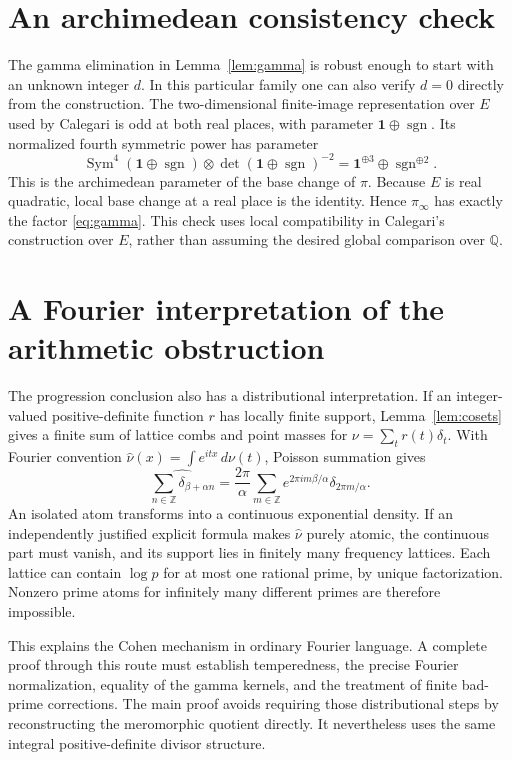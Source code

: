\documentclass[11pt]{article}
\theoremstyle{definition}
\theoremstyle{remark}
\newcommand{\Q}{\mathbb Q}
\newcommand{\Z}{\mathbb Z}
\newcommand{\one}{\mathbf 1}
\newcommand{\dd}{\,d}
\numberwithin{equation}{section}
\begin{document}
\appendix
\section{An archimedean consistency check}

The gamma elimination in Lemma~\ref{lem:gamma} is robust enough to start with an unknown integer $d$. In this particular family one can also verify $d=0$ directly from the construction. The two-dimensional finite-image representation over $E$ used by Calegari is odd at both real places, with parameter $\one\oplus\operatorname{sgn}$. Its normalized fourth symmetric power has parameter
\[
\operatorname{Sym}^4(\one\oplus\operatorname{sgn})
\otimes\det(\one\oplus\operatorname{sgn})^{-2}
=\one^{\oplus3}\oplus\operatorname{sgn}^{\oplus2}.
\]
This is the archimedean parameter of the base change of $\pi$. Because $E$ is real quadratic, local base change at a real place is the identity. Hence $\pi_\infty$ has exactly the factor \eqref{eq:gamma}. This check uses local compatibility in Calegari's construction over $E$, rather than assuming the desired global comparison over $\Q$.

\section{A Fourier interpretation of the arithmetic obstruction}

The progression conclusion also has a distributional interpretation. If an integer-valued positive-definite function $r$ has locally finite support, Lemma~\ref{lem:cosets} gives a finite sum of lattice combs and point masses for
$\nu=\sum_t r(t)\delta_t$. With Fourier convention
$\widehat\nu(x)=\int e^{itx}\dd\nu(t)$, Poisson summation gives
\[
\widehat{\sum_{n\in\Z}\delta_{\beta+\alpha n}}
=\frac{2\pi}{\alpha}\sum_{m\in\Z}
e^{2\pi im\beta/\alpha}\delta_{2\pi m/\alpha}.
\]
An isolated atom transforms into a continuous exponential density. If an independently justified explicit formula makes $\widehat\nu$ purely atomic, the continuous part must vanish, and its support lies in finitely many frequency lattices. Each lattice can contain $\log p$ for at most one rational prime, by unique factorization. Nonzero prime atoms for infinitely many different primes are therefore impossible.

This explains the Cohen mechanism in ordinary Fourier language. A complete proof through this route must establish temperedness, the precise Fourier normalization, equality of the gamma kernels, and the treatment of finite bad-prime corrections. The main proof avoids requiring those distributional steps by reconstructing the meromorphic quotient directly. It nevertheless uses the same integral positive-definite divisor structure.
\end{document}
